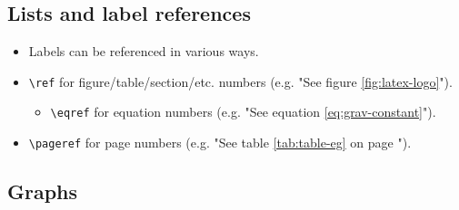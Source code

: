\begin{figure}[H]
\end{figure}

\subsection{Lists and label references}

\begin{itemize} %
    \item Labels can be referenced in various ways.
    \item \verb|\ref| for figure/table/section/etc. numbers (e.g. "See figure \ref{fig:latex-logo}").
    \begin{itemize} %
        \item \verb|\eqref| for equation numbers (e.g. "See equation \eqref{eq:grav-constant}").
    \end{itemize}
    \item \verb|\pageref| for page numbers (e.g. "See table \ref{tab:table-eg} on page \pageref{tab:table-eg}").
\end{itemize}

\subsection{Graphs}

